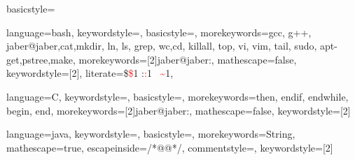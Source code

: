 \usepackage{moreverb}
\usepackage{verbatim}
\usepackage{multirow}
\usepackage{xspace}



%

\newcommand{\ed}[2]{#1 \rightarrow #2}
\newcommand{\rr}[1]{\textcolor{red}{#1}}

\usepackage{color}
\usepackage{amsmath}
\usepackage{amssymb}
\usepackage{fancybox} %
\usepackage{graphicx} %
\usepackage{graphicx,color} %
\usepackage{moreverb}
\usepackage{epsfig} %
\usepackage{subfigure}
\usepackage{multirow}
\usepackage{algorithm}




\usepackage{listings}


{basicstyle=\scriptsize\bf\ttfamily
}

{language=bash,
keywordstyle=\color{blue},
basicstyle=\ttfamily\scriptsize,
morekeywords={gcc, g++, jaber@jaber,cat,mkdir, ln, ls, grep, wc,cd, killall, top, vi, vim, tail, sudo, apt-get,pstree,make},
morekeywords=[2]{jaber@jaber:},
mathescape=false,
keywordstyle=[2]{\color{red}},
literate={\$}{{\textcolor{red}{\$}}}1 
         {:}{{\textcolor{red}{:}}}1
         {~}{{\textcolor{red}{\textasciitilde}}}1,
}

{language=C,
keywordstyle=\color{blue},
basicstyle=\ttfamily\scriptsize,
morekeywords={then, endif, endwhile, begin, end},
morekeywords=[2]{jaber@jaber:},
mathescape=false,
keywordstyle=[2]{\color{red}}
}


{language=java,
keywordstyle=\color{blue},
basicstyle=\ttfamily\scriptsize,
morekeywords={String},
mathescape=true,
escapeinside={/*@}{@*/},
commentstyle=\color{dkgreen},   %
keywordstyle=[2]{\color{red}}
}



